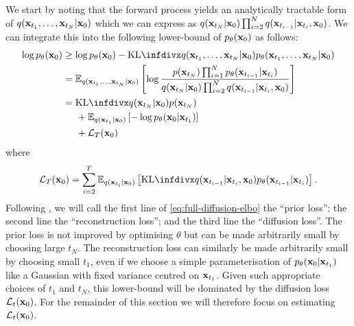 We start by noting that the forward process yields an analytically tractable form of $q({\mathbf{x}}_{t_1},\ldots,{\mathbf{x}}_{t_N}|{\mathbf{x}}_0)$ which we can express as $q({\mathbf{x}}_{t_N}|{\mathbf{x}}_0) \prod_{i=2}^N q({\mathbf{x}}_{t_{i-1}} | {\mathbf{x}}_{t_i}, {\mathbf{x}}_0)$. We can integrate this into the following lower-bound of $p_\theta({\mathbf{x}}_0)$ as follows:
\begin{align}
    \log p_\theta(\rvx_0) &\geq \log p_\theta(\rvx_0) - \kl{q(\rvx_{t_1},\ldots,\rvx_{t_N}|\rvx_0)}{p_\theta(\rvx_{t_1},\ldots,\rvx_{t_N}|\rvx_0)} \\
    &= \EX_{q(\rvx_{t_1},\ldots,\rvx_{t_N}|\rvx_0)} \left[ \log \frac{p(\rvx_{t_N}) \prod_{i=1}^N p_\theta(\rvx_{t_{i-1}} | \rvx_{t_i})}{q(\rvx_{t_N}|\rvx_0) \prod_{i=2}^N q(\rvx_{t_{i-1}} | \rvx_{t_i}, \rvx_0)} \right] \\
    &= \kl{q(\rvx_{t_N}|\rvx_0)}{p(\rvx_{t_N})} \nonumber\\
    &\hspace{5mm} + \EX_{q(\rvx_{t_1}|\rvx_0)} \left[ - \log p_\theta(\rvx_0|\rvx_{t_1}) \right] \nonumber\\
    &\hspace{5mm} + \mathcal{L}_T(\rvx_0) \label{eq:full-diffusion-elbo}
\end{align}
where
\begin{align}
    \mathcal{L}_T(\rvx_0) = \sum_{i=2}^T \EX_{q(\rvx_{t_i}|\rvx_0)} \left[ \kl{q(\rvx_{t_{i-1}} | \rvx_{t_i}, \rvx_0)}{p_\theta(\rvx_{t_{i-1}} | \rvx_{t_i})} \right].
\end{align}
Following \citet{kingma2021variational}, we will call the first line of \cref{eq:full-diffusion-elbo} the ``prior loss''; the second line the ``reconstruction loss''; and the third line the ``diffusion loss''. The prior loss is not improved by optimising $\theta$ but can be made arbitrarily small by choosing large $t_N$. The reconstruction loss can similarly be made arbitrarily small by choosing small $t_1$, even if we choose a simple parameterisation of $p_\theta({\mathbf{x}}_0|{\mathbf{x}}_{t_1})$ like a Gaussian with fixed variance centred on ${\mathbf{x}}_{t_1}$. Given such appropriate choices of $t_1$ and $t_N$, this lower-bound will be dominated by the diffusion loss $\mathcal{L}_t({\mathbf{x}}_0)$. For the remainder of this section we will therefore focus on estimating $\mathcal{L}_t({\mathbf{x}}_0)$.

